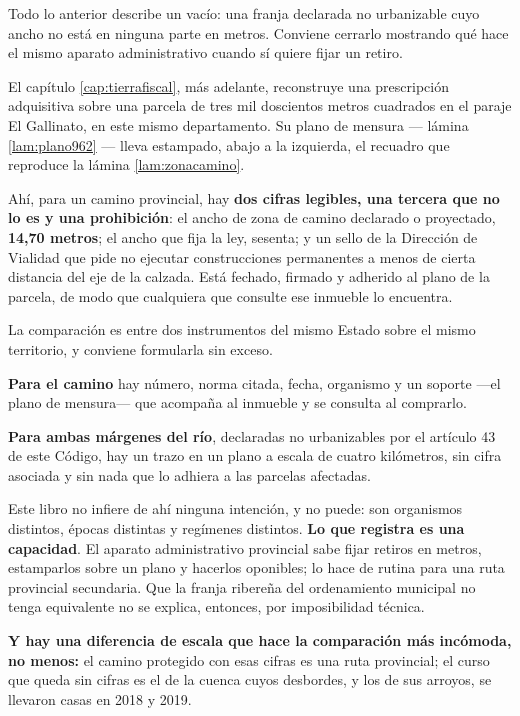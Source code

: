 Todo lo anterior describe un vacío: una franja declarada no urbanizable cuyo ancho no está
en ninguna parte en metros. Conviene cerrarlo mostrando qué hace el mismo aparato
administrativo cuando sí quiere fijar un retiro.

El capítulo \ref{cap:tierrafiscal}, más adelante, reconstruye una prescripción adquisitiva sobre una parcela
de tres mil doscientos metros cuadrados en el paraje El Gallinato, en este mismo
departamento. Su plano de mensura --- lámina \ref{lam:plano962} --- lleva estampado, abajo a
la izquierda, el recuadro que reproduce la lámina \ref{lam:zonacamino}.

Ahí, para un camino provincial, hay \textbf{dos cifras legibles, una tercera que no lo es y una prohibición}: el ancho de zona
de camino declarado o proyectado, \textbf{14,70 metros}; el ancho que fija la ley, sesenta;
y un sello de la Dirección de Vialidad que pide no ejecutar construcciones permanentes a
menos de cierta distancia del eje de la calzada. Está fechado, firmado y adherido al plano de
la parcela, de modo que cualquiera que consulte ese inmueble lo encuentra.

\begin{cautela}
La comparación es entre dos instrumentos del mismo Estado sobre el mismo territorio, y
conviene formularla sin exceso.

\textbf{Para el camino} hay número, norma citada, fecha, organismo y un soporte ---el plano
de mensura--- que acompaña al inmueble y se consulta al comprarlo.

\textbf{Para ambas márgenes del río}, declaradas no urbanizables por el artículo 43 de este
Código, hay un trazo en un plano a escala de cuatro kilómetros, sin cifra asociada y sin nada que lo
adhiera a las parcelas afectadas.

Este libro no infiere de ahí ninguna intención, y no puede: son organismos distintos, épocas
distintas y regímenes distintos. \textbf{Lo que registra es una capacidad}. El aparato
administrativo provincial sabe fijar retiros en metros, estamparlos sobre un plano y hacerlos
oponibles; lo hace de rutina para una ruta provincial secundaria. Que la franja ribereña del ordenamiento
municipal no tenga equivalente no se explica, entonces, por imposibilidad técnica.

\textbf{Y hay una diferencia de escala que hace la comparación más incómoda, no menos:} el
camino protegido con esas cifras es una ruta provincial; el curso que queda sin cifras es el
de la cuenca cuyos desbordes, y los de sus arroyos, se llevaron casas en 2018 y 2019.
\end{cautela}

